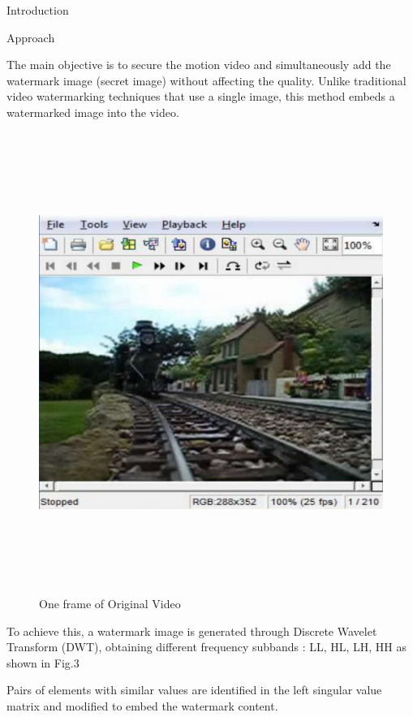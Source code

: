 \documentclass[final]{beamer}
\newlength{\colwidth}
\begin{document}
\begin{frame}[t]
\begin{columns}[t]
\begin{column}{\colwidth}
\begin{block}{Introduction}
\end{block}

\begin{block}{Approach}

 The main objective is to secure the motion video and simultaneously add the watermark image (secret image) without affecting the quality.
  Unlike traditional video watermarking techniques that use a single image, this method embeds a watermarked image into the video. 
  \lipsum
\begin{figure}
    \centering
    \includegraphics[width=1.0\textwidth , height=15cm]{images and logos/orginal video frame.pdf}
\caption{One frame of Original Video}
    \label{fig:img1}
\end{figure}
\lipsum

  \par To achieve this, a watermark image is generated through Discrete Wavelet Transform (DWT), obtaining different frequency subbands : LL, HL, LH, HH as shown in Fig.3
  \par Pairs of elements with similar values are identified in the left singular value matrix and modified to embed the watermark content.
  

\end{block}
\end{column}
\end{columns}
\end{frame}
\end{document}
